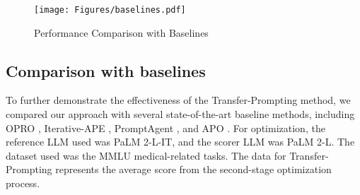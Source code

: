 


\begin{figure}[!h]
\centering
\texttt{[image: Figures/baselines.pdf]}

\caption{Performance Comparison with Baselines}
\label{fig: baselines}
\end{figure}


\subsection{Comparison with baselines}

To further demonstrate the effectiveness of the Transfer-Prompting method, we compared our approach with several state-of-the-art baseline methods, including OPRO \citep{yang2024largelanguagemodelsoptimizers}, Iterative-APE \citep{zhou2022large}, PromptAgent \citep{wang2023promptagent}, and APO \citep{pryzant2023automatic}. For optimization, the reference LLM used was PaLM 2-L-IT, and the scorer LLM was PaLM 2-L. The dataset used was the MMLU medical-related tasks. The data for Transfer-Prompting represents the average score from the second-stage optimization process.

